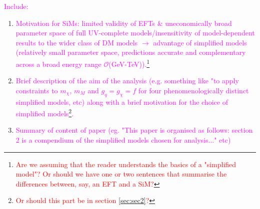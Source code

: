 \begin{flushleft}
\textcolor{magenta}{Include:}
\begin{enumerate}
\item \textcolor{magenta}{Motivation for SiMs: limited validity of EFTs \& uneconomically broad parameter space of full UV-complete models/insensitivity of model-dependent results to the wider class of DM models $\rightarrow$ advantage of simplified models (relatively small parameter space, predictions accurate and complementary across a broad energy range $\mathcal{O}$(GeV-TeV)).\footnote{\textcolor{red}{Are we assuming that the reader understands the basics of a "simplified model"? Or should we have one or two sentences that summarise the differences between, say, an EFT and a SiM?}}}
\item \textcolor{magenta}{Brief description of the aim of the analysis (e.g. something like "to apply constraints to $m_{\chi}$, $m_{M}$ and $g_{q} = g_{\chi} = f$ for four phenomenologically distinct simplified models, etc) along with a brief motivation for the choice of simplified models\footnote{\textcolor{red}{Or should this part be in section \ref{sec:sec2}?}}.}
\item \textcolor{magenta}{Summary of content of paper (eg. "This paper is organised as follows: section 2 is a compendium of the simplified models chosen for analysis..." etc)}
\end{enumerate}
\end{flushleft}